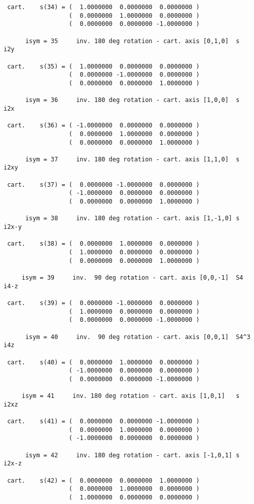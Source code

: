 \documentclass[12pt,a4paper,twoside]{report}
\begin{document}
\begin{tcolorbox}
\begin{scriptsize}
\begin{verbatim}
 cart.    s(34) = (  1.0000000  0.0000000  0.0000000 )
                  (  0.0000000  1.0000000  0.0000000 )
                  (  0.0000000  0.0000000 -1.0000000 )

      isym = 35     inv. 180 deg rotation - cart. axis [0,1,0]  s      i2y

 cart.    s(35) = (  1.0000000  0.0000000  0.0000000 )
                  (  0.0000000 -1.0000000  0.0000000 )
                  (  0.0000000  0.0000000  1.0000000 )

      isym = 36     inv. 180 deg rotation - cart. axis [1,0,0]  s      i2x

 cart.    s(36) = ( -1.0000000  0.0000000  0.0000000 )
                  (  0.0000000  1.0000000  0.0000000 )
                  (  0.0000000  0.0000000  1.0000000 )

      isym = 37     inv. 180 deg rotation - cart. axis [1,1,0]  s      i2xy

 cart.    s(37) = (  0.0000000 -1.0000000  0.0000000 )
                  ( -1.0000000  0.0000000  0.0000000 )
                  (  0.0000000  0.0000000  1.0000000 )

      isym = 38     inv. 180 deg rotation - cart. axis [1,-1,0] s      i2x-y

 cart.    s(38) = (  0.0000000  1.0000000  0.0000000 )
                  (  1.0000000  0.0000000  0.0000000 )
                  (  0.0000000  0.0000000  1.0000000 )

     isym = 39     inv.  90 deg rotation - cart. axis [0,0,-1]  S4     i4-z

 cart.    s(39) = (  0.0000000 -1.0000000  0.0000000 )
                  (  1.0000000  0.0000000  0.0000000 )
                  (  0.0000000  0.0000000 -1.0000000 )

      isym = 40     inv.  90 deg rotation - cart. axis [0,0,1]  S4^3   i4z

 cart.    s(40) = (  0.0000000  1.0000000  0.0000000 )
                  ( -1.0000000  0.0000000  0.0000000 )
                  (  0.0000000  0.0000000 -1.0000000 )

     isym = 41     inv. 180 deg rotation - cart. axis [1,0,1]   s      i2xz

 cart.    s(41) = (  0.0000000  0.0000000 -1.0000000 )
                  (  0.0000000  1.0000000  0.0000000 )
                  ( -1.0000000  0.0000000  0.0000000 )

      isym = 42     inv. 180 deg rotation - cart. axis [-1,0,1] s      i2x-z

 cart.    s(42) = (  0.0000000  0.0000000  1.0000000 )
                  (  0.0000000  1.0000000  0.0000000 )
                  (  1.0000000  0.0000000  0.0000000 )


\end{verbatim}
\end{scriptsize}
\end{tcolorbox}
\end{document}
